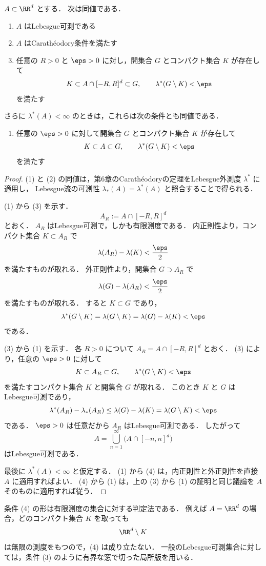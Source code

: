 \begin{theorem}[判定法]
$A\subset\RR^d$ とする．
次は同値である．
\begin{enumerate}
    \item $A$ はLebesgue可測である
    \item $A$ はCarathéodory条件を満たす
    \item 任意の $R>0$ と $\eps>0$ に対し，開集合 $G$ とコンパクト集合 $K$ が存在して
    \[
    K\subset A\cap[-R,R]^d\subset G,
    \qquad
    \lambda^*(G\setminus K)<\eps
    \]
    を満たす
\end{enumerate}
さらに $\lambda^*(A)<\infty$ のときは，これらは次の条件とも同値である．
\begin{enumerate}
    \item[(4)] 任意の $\eps>0$ に対して開集合 $G$ とコンパクト集合 $K$ が存在して
    \[
    K\subset A\subset G,
    \qquad
    \lambda^*(G\setminus K)<\eps
    \]
    を満たす
\end{enumerate}
\end{theorem}
\begin{proof}
(1) と (2) の同値は，第6章のCarathéodoryの定理をLebesgue外測度 $\lambda^*$ に適用し，
Lebesgue流の可測性 $\lambda_*(A)=\lambda^*(A)$ と照合することで得られる．

(1) から (3) を示す．
\[
A_R:=A\cap[-R,R]^d
\]
とおく．
$A_R$ はLebesgue可測で，しかも有限測度である．
内正則性より，コンパクト集合 $K\subset A_R$ で
\[
\lambda(A_R)-\lambda(K)<\frac{\eps}{2}
\]
を満たすものが取れる．
外正則性より，開集合 $G\supset A_R$ で
\[
\lambda(G)-\lambda(A_R)<\frac{\eps}{2}
\]
を満たすものが取れる．
すると $K\subset G$ であり，
\[
\lambda^*(G\setminus K)
=
\lambda(G\setminus K)
=
\lambda(G)-\lambda(K)
<\eps
\]
である．

(3) から (1) を示す．
各 $R>0$ について $A_R=A\cap[-R,R]^d$ とおく．
(3) により，任意の $\eps>0$ に対して
\[
K\subset A_R\subset G,
\qquad
\lambda^*(G\setminus K)<\eps
\]
を満たすコンパクト集合 $K$ と開集合 $G$ が取れる．
このとき $K$ と $G$ はLebesgue可測であり，
\[
\lambda^*(A_R)-\lambda_*(A_R)
\le
\lambda(G)-\lambda(K)
=
\lambda(G\setminus K)
<\eps
\]
である．
$\eps>0$ は任意だから $A_R$ はLebesgue可測である．
したがって
\[
A=\bigcup_{n=1}^{\infty}\bigl(A\cap[-n,n]^d\bigr)
\]
はLebesgue可測である．

最後に $\lambda^*(A)<\infty$ と仮定する．
(1) から (4) は，内正則性と外正則性を直接 $A$ に適用すればよい．
(4) から (1) は，上の (3) から (1) の証明と同じ議論を $A$ そのものに適用すれば従う．
\end{proof}

\begin{remark}
条件 (4) の形は有限測度の集合に対する判定法である．
例えば $A=\RR^d$ の場合，どのコンパクト集合 $K$ を取っても
\[
\RR^d\setminus K
\]
は無限の測度をもつので，(4) は成り立たない．
一般のLebesgue可測集合に対しては，条件 (3) のように有界な窓で切った局所版を用いる．
\end{remark}
